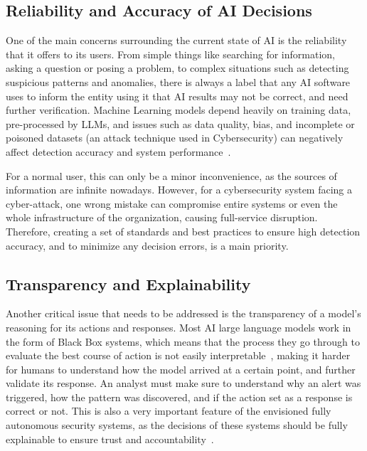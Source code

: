 \documentclass[12pt,a4paper]{report}
\begin{document}
\subsection{Reliability and Accuracy of AI Decisions}

One of the main concerns surrounding the current state of AI is the reliability that it offers
to its users. From simple things like searching for information, asking a question or posing a
problem, to complex situations such as detecting suspicious patterns and anomalies, there is
always a label that any AI software uses to inform the entity using it that AI results may not
be correct, and need further verification. Machine Learning models depend heavily on training
data, pre-processed by LLMs, and issues such as data quality, bias, and incomplete or poisoned
datasets (an attack technique used in Cybersecurity) can negatively affect detection accuracy and
system performance~\cite{ref21}.

For a normal user, this can only be a minor inconvenience, as the sources of information are
infinite nowadays. However, for a cybersecurity system facing a cyber-attack, one wrong mistake
can compromise entire systems or even the whole infrastructure of the organization, causing
full-service disruption. Therefore, creating a set of standards and best practices to ensure
high detection accuracy, and to minimize any decision errors, is a main priority.

\subsection{Transparency and Explainability}

Another critical issue that needs to be addressed is the transparency of a model's reasoning for
its actions and responses. Most AI large language models work in the form of Black Box systems,
which means that the process they go through to evaluate the best course of action is not easily
interpretable~\cite{ref25}, making it harder for humans to understand how the model arrived at a
certain point, and further validate its response. An analyst must make sure to understand why an
alert was triggered, how the pattern was discovered, and if the action set as a response is
correct or not. This is also a very important feature of the envisioned fully autonomous security
systems, as the decisions of these systems should be fully explainable to ensure trust and
accountability~\cite{ref25}.
\end{document}
